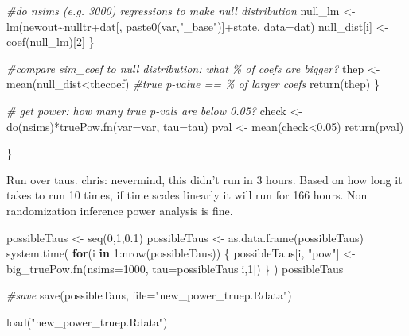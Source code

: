 \documentclass[
]{article}
\newenvironment{Shaded}{\begin{snugshade}}{\end{snugshade}}
\newcommand{\AttributeTok}[1]{\textcolor[rgb]{0.77,0.63,0.00}{#1}}
\newcommand{\CommentTok}[1]{\textcolor[rgb]{0.56,0.35,0.01}{\textit{#1}}}
\newcommand{\ControlFlowTok}[1]{\textcolor[rgb]{0.13,0.29,0.53}{\textbf{#1}}}
\newcommand{\DecValTok}[1]{\textcolor[rgb]{0.00,0.00,0.81}{#1}}
\newcommand{\FloatTok}[1]{\textcolor[rgb]{0.00,0.00,0.81}{#1}}
\newcommand{\FunctionTok}[1]{\textcolor[rgb]{0.00,0.00,0.00}{#1}}
\newcommand{\NormalTok}[1]{#1}
\newcommand{\OtherTok}[1]{\textcolor[rgb]{0.56,0.35,0.01}{#1}}
\newcommand{\SpecialCharTok}[1]{\textcolor[rgb]{0.00,0.00,0.00}{#1}}
\newcommand{\StringTok}[1]{\textcolor[rgb]{0.31,0.60,0.02}{#1}}
\begin{document}
\begin{Shaded}
\begin{Highlighting}[]
    \CommentTok{\#do nsims (e.g. 3000) regressions to make null distribution}
\NormalTok{    null\_lm }\OtherTok{\textless{}{-}} \FunctionTok{lm}\NormalTok{(newout}\SpecialCharTok{\textasciitilde{}}\NormalTok{nulltr}\SpecialCharTok{+}\NormalTok{dat[, }\FunctionTok{paste0}\NormalTok{(var,}\StringTok{"\_base"}\NormalTok{)]}\SpecialCharTok{+}\NormalTok{state, }\AttributeTok{data=}\NormalTok{dat)}
\NormalTok{    null\_dist[i] }\OtherTok{\textless{}{-}} \FunctionTok{coef}\NormalTok{(null\_lm)[}\DecValTok{2}\NormalTok{]}
\NormalTok{  \}}
  
  \CommentTok{\#compare sim\_coef to null distribution: what \% of coefs are bigger?}
\NormalTok{  thep }\OtherTok{\textless{}{-}} \FunctionTok{mean}\NormalTok{(null\_dist}\SpecialCharTok{\textless{}}\NormalTok{thecoef)}
  \CommentTok{\#true p{-}value == \% of larger coefs}
  \FunctionTok{return}\NormalTok{(thep)}
\NormalTok{\}}

  \CommentTok{\# get power: how many true p{-}vals are below 0.05?}
\NormalTok{  check }\OtherTok{\textless{}{-}} \FunctionTok{do}\NormalTok{(nsims)}\SpecialCharTok{*}\FunctionTok{truePow.fn}\NormalTok{(}\AttributeTok{var=}\NormalTok{var, }\AttributeTok{tau=}\NormalTok{tau)}
\NormalTok{  pval }\OtherTok{\textless{}{-}} \FunctionTok{mean}\NormalTok{(check}\SpecialCharTok{\textless{}}\FloatTok{0.05}\NormalTok{)}
  \FunctionTok{return}\NormalTok{(pval)}

\NormalTok{\}}
\end{Highlighting}
\end{Shaded}

Run over taus. chris: nevermind, this didn't run in 3 hours. Based on
how long it takes to run 10 times, if time scales linearly it will run
for 166 hours. Non randomization inference power analysis is fine.

\begin{Shaded}
\begin{Highlighting}[]
\NormalTok{possibleTaus }\OtherTok{\textless{}{-}} \FunctionTok{seq}\NormalTok{(}\DecValTok{0}\NormalTok{,}\DecValTok{1}\NormalTok{,}\FloatTok{0.1}\NormalTok{)}
\NormalTok{possibleTaus }\OtherTok{\textless{}{-}} \FunctionTok{as.data.frame}\NormalTok{(possibleTaus)}
\FunctionTok{system.time}\NormalTok{(}
\ControlFlowTok{for}\NormalTok{(i }\ControlFlowTok{in} \DecValTok{1}\SpecialCharTok{:}\FunctionTok{nrow}\NormalTok{(possibleTaus))}
\NormalTok{\{}
\NormalTok{  possibleTaus[i, }\StringTok{"pow"}\NormalTok{] }\OtherTok{\textless{}{-}} \FunctionTok{big\_truePow.fn}\NormalTok{(}\AttributeTok{nsims=}\DecValTok{1000}\NormalTok{, }\AttributeTok{tau=}\NormalTok{possibleTaus[i,}\DecValTok{1}\NormalTok{])}
\NormalTok{\}}
\NormalTok{)}
\NormalTok{possibleTaus}

\CommentTok{\#save}
\FunctionTok{save}\NormalTok{(possibleTaus, }\AttributeTok{file=}\StringTok{"new\_power\_truep.Rdata"}\NormalTok{)}
\end{Highlighting}
\end{Shaded}

\begin{Shaded}
\begin{Highlighting}[]
\FunctionTok{load}\NormalTok{(}\StringTok{"new\_power\_truep.Rdata"}\NormalTok{)}
\end{Highlighting}
\end{Shaded}
\end{document}
